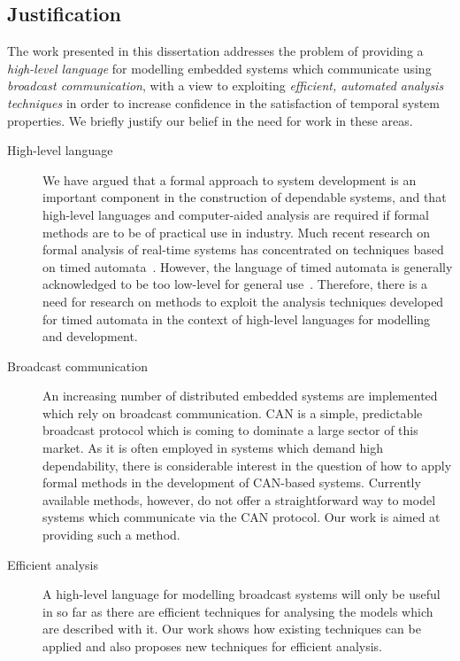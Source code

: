 \subsection{Justification}
The work presented in this dissertation addresses the problem of
providing a \emph{high-level language} for modelling embedded systems
which communicate using \emph{broadcast communication}, with a view to
exploiting \emph{efficient, automated analysis techniques} in order to
increase confidence in the satisfaction of temporal system properties.
We briefly justify our belief in the need for work in these areas.
\begin{description}
\item[High-level language]  
We have argued that a formal approach to system development is an
important component in the construction of dependable systems, and
that high-level languages and computer-aided analysis are required if
formal methods are to be of practical use in industry. Much recent
research on formal analysis of real-time systems has concentrated on
techniques based on timed automata~\cite{ad:90}. However, the language
of timed automata is generally acknowledged to be too low-level for
general use~\cite{ad:94,bfk:98,tri:98,pet:99}.  Therefore, there is a
need for research on methods to exploit the analysis techniques
developed for timed automata in the context of high-level languages
for modelling and development.

\item[Broadcast communication]
An increasing number of distributed embedded systems are implemented
which rely on broadcast communication.  CAN is a simple, predictable
broadcast protocol which is coming to dominate a large sector of this
market. As it is often employed in systems which demand high
dependability, there is considerable interest in the question of how
to apply formal methods in the development of CAN-based
systems. Currently available methods, however, do not offer a
straightforward way to model systems which communicate via the CAN protocol.
Our work is aimed at providing such a method.

\item[Efficient analysis]
A high-level language for modelling broadcast systems will only be
useful in so far as there are efficient techniques for analysing
the models which are described with it. Our work shows how existing
techniques can be applied and also proposes new techniques for efficient
analysis.   
\end{description}

